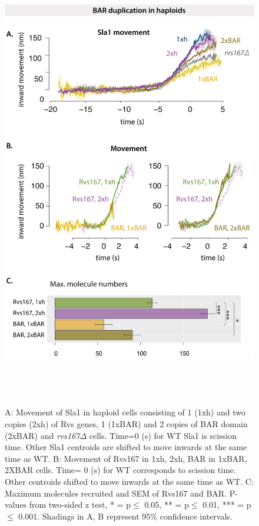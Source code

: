 		\begin{figure}[H]
		\vspace*{-2 mm}
		\hspace{-0.5cm}
		\includegraphics[width=20cm,height=20cm,keepaspectratio]{figures/results_final/scaffolding_overlaid3}
		\caption [Overexpression of the Rvs BAR domain]
		{A: Movement of Sla1 in haploid cells consisting of 1 (1xh) and two copies (2xh) of Rvs genes, 1 (1xBAR) and 2 copies of BAR domain (2xBAR) and  \textit{rvs167$\Delta$} cells. Time=0 (s) for WT Sla1 is scission time. Other Sla1 centroids are shifted to move inwards at the same time as WT.
		B: Movement of Rvs167 in 1xh, 2xh, BAR in 1xBAR, 2XBAR cells. Time= 0 (s) for WT corresponds to scission time. Other centroids shifted to move inwards at the same time as WT.
		C: Maximum molecules recruited and SEM of Rvs167 and BAR. P-values from two-sided z test, * = p$\leq$ 0.05, ** = p$\leq$ 0.01, *** = p$\leq$ 0.001. Shadings in A, B represent 95\% confidence intervals.}
		\label{fig_scaffold}
		\end{figure}


